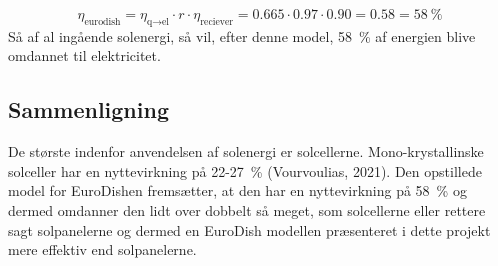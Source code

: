 \documentclass[SRC.tex]{subfiles}
\begin{document}
	\begin{equation}
		\eta_{\text{eurodish}} = \eta_{\text{q}\rightarrow\text{el}} \cdot r \cdot \eta_{\text{reciever}}  = 0.665 \cdot 0.97 \cdot 0.90 = 0.58 = \SI{58}{\percent}
	\end{equation} 
	Så af al ingående solenergi, så vil, efter denne model, \SI{58}{\percent} af energien blive omdannet til elektricitet. 
	\subsection{Sammenligning}
	De største indenfor anvendelsen af solenergi er solcellerne. Mono-krystallinske solceller har en nyttevirkning på 22-\SI{27}{\percent} (Vourvoulias, 2021).
	Den opstillede model for EuroDishen fremsætter, at den har en nyttevirkning på \SI{58}{\percent} 
	og dermed omdanner den lidt over dobbelt så meget, som solcellerne eller rettere sagt solpanelerne og dermed en EuroDish modellen præsenteret i dette projekt mere effektiv end solpanelerne. 
\end{document}
